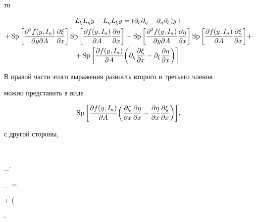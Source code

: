 то


\begin{multline*}


L_\xi L_\eta y-L_\eta L_\xi y=


(\partial_\xi\partial_\eta-\partial_\eta \partial_\xi) y+ \\


+\SP\bigg[ \frac{\partial^2 f(y,I_n)}{\partial y\partial A}


\frac{\partial\xi}{\partial x}\bigg]\SP


\bigg[ \frac{\partial f(y,I_n)}{\partial A}


\frac{\partial\eta}{\partial x}\bigg]-\SP


\bigg[ \frac{\partial^2 f(y,I_n)}{\partial y\partial A}


\frac{\partial\eta}{\partial x}\bigg]\SP


\bigg[ \frac{\partial f(y,I_n)}{\partial A}


\frac{\partial\xi}{\partial x}\bigg]+ \\


+\SP\bigg[ \frac{\partial f(y,I_n)}{\partial A}\bigg(


\partial_\eta\frac{\partial\xi}{\partial x}-


\partial_\xi\frac{\partial\eta}{\partial x}\bigg)\bigg].


\end{multline*}


В правой части этого выражения разность второго и третьего членов


можно представить в виде


$$


\SP\bigg[ \frac{\partial f(y,I_n)}{\partial A}\bigg(


\frac{\partial\xi}{\partial x}\frac{\partial\eta}{\partial x}-


\frac{\partial\eta}{\partial x}\frac{\partial\xi}{\partial x}


\bigg)\bigg],


$$


с другой стороны,


$$


\partial_\eta{}-


\partial_\xi{} =


+ \bigg(


-




